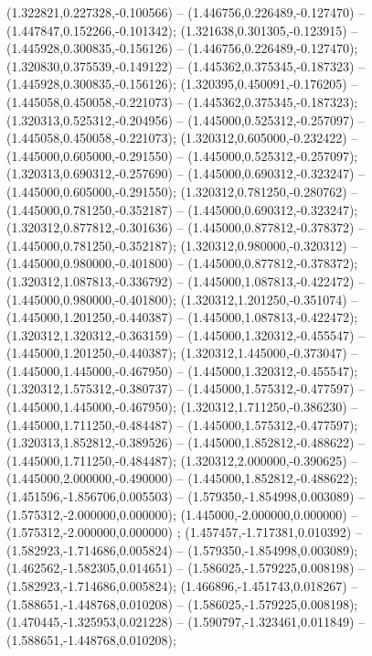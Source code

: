  (1.322821,0.227328,-0.100566) -- (1.446756,0.226489,-0.127470) -- (1.447847,0.152266,-0.101342);
 (1.321638,0.301305,-0.123915) -- (1.445928,0.300835,-0.156126) -- (1.446756,0.226489,-0.127470);
 (1.320830,0.375539,-0.149122) -- (1.445362,0.375345,-0.187323) -- (1.445928,0.300835,-0.156126);
 (1.320395,0.450091,-0.176205) -- (1.445058,0.450058,-0.221073) -- (1.445362,0.375345,-0.187323);
 (1.320313,0.525312,-0.204956) -- (1.445000,0.525312,-0.257097) -- (1.445058,0.450058,-0.221073);
 (1.320312,0.605000,-0.232422) -- (1.445000,0.605000,-0.291550) -- (1.445000,0.525312,-0.257097);
 (1.320313,0.690312,-0.257690) -- (1.445000,0.690312,-0.323247) -- (1.445000,0.605000,-0.291550);
 (1.320312,0.781250,-0.280762) -- (1.445000,0.781250,-0.352187) -- (1.445000,0.690312,-0.323247);
 (1.320312,0.877812,-0.301636) -- (1.445000,0.877812,-0.378372) -- (1.445000,0.781250,-0.352187);
 (1.320312,0.980000,-0.320312) -- (1.445000,0.980000,-0.401800) -- (1.445000,0.877812,-0.378372);
 (1.320312,1.087813,-0.336792) -- (1.445000,1.087813,-0.422472) -- (1.445000,0.980000,-0.401800);
 (1.320312,1.201250,-0.351074) -- (1.445000,1.201250,-0.440387) -- (1.445000,1.087813,-0.422472);
 (1.320312,1.320312,-0.363159) -- (1.445000,1.320312,-0.455547) -- (1.445000,1.201250,-0.440387);
 (1.320312,1.445000,-0.373047) -- (1.445000,1.445000,-0.467950) -- (1.445000,1.320312,-0.455547);
 (1.320312,1.575312,-0.380737) -- (1.445000,1.575312,-0.477597) -- (1.445000,1.445000,-0.467950);
 (1.320312,1.711250,-0.386230) -- (1.445000,1.711250,-0.484487) -- (1.445000,1.575312,-0.477597);
 (1.320313,1.852812,-0.389526) -- (1.445000,1.852812,-0.488622) -- (1.445000,1.711250,-0.484487);
 (1.320312,2.000000,-0.390625) -- (1.445000,2.000000,-0.490000) -- (1.445000,1.852812,-0.488622);
 (1.451596,-1.856706,0.005503) -- (1.579350,-1.854998,0.003089) -- (1.575312,-2.000000,0.000000);
 (1.445000,-2.000000,0.000000) -- (1.575312,-2.000000,0.000000) ;
 (1.457457,-1.717381,0.010392) -- (1.582923,-1.714686,0.005824) -- (1.579350,-1.854998,0.003089);
 (1.462562,-1.582305,0.014651) -- (1.586025,-1.579225,0.008198) -- (1.582923,-1.714686,0.005824);
 (1.466896,-1.451743,0.018267) -- (1.588651,-1.448768,0.010208) -- (1.586025,-1.579225,0.008198);
 (1.470445,-1.325953,0.021228) -- (1.590797,-1.323461,0.011849) -- (1.588651,-1.448768,0.010208);
